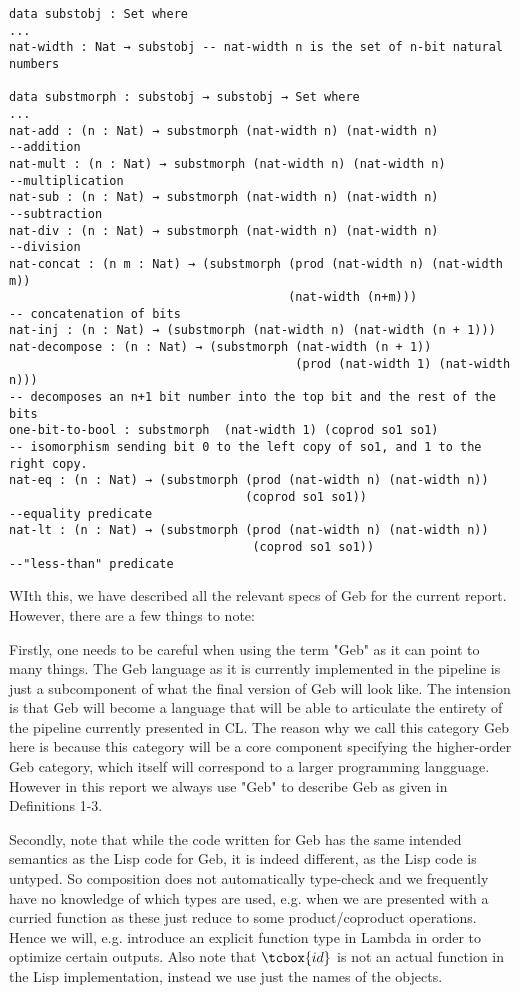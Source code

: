 \begin{verbatim}
data substobj : Set where
...
nat-width : Nat → substobj -- nat-width n is the set of n-bit natural numbers

data substmorph : substobj → substobj → Set where
...
nat-add : (n : Nat) → substmorph (nat-width n) (nat-width n) 
--addition
nat-mult : (n : Nat) → substmorph (nat-width n) (nat-width n)
--multiplication
nat-sub : (n : Nat) → substmorph (nat-width n) (nat-width n)
--subtraction
nat-div : (n : Nat) → substmorph (nat-width n) (nat-width n) 
--division 
nat-concat : (n m : Nat) → (substmorph (prod (nat-width n) (nat-width m))
                                       (nat-width (n+m))) 
-- concatenation of bits
nat-inj : (n : Nat) → (substmorph (nat-width n) (nat-width (n + 1)))
nat-decompose : (n : Nat) → (substmorph (nat-width (n + 1)) 
                                        (prod (nat-width 1) (nat-width n)))
-- decomposes an n+1 bit number into the top bit and the rest of the bits
one-bit-to-bool : substmorph  (nat-width 1) (coprod so1 so1)
-- isomorphism sending bit 0 to the left copy of so1, and 1 to the right copy.
nat-eq : (n : Nat) → (substmorph (prod (nat-width n) (nat-width n)) 
                                 (coprod so1 so1))
--equality predicate
nat-lt : (n : Nat) → (substmorph (prod (nat-width n) (nat-width n))
                                  (coprod so1 so1))
--"less-than" predicate
\end{verbatim}

WIth this, we have described all the relevant specs of Geb for the current report. However, there are a few things to note:

Firstly, one needs to be careful when using the term "Geb" as it can point to many things. The Geb language as it is currently implemented in the pipeline is just a subcomponent of what the final version of Geb will look like. The intension is that Geb will become a language that will be able to articulate the entirety of the pipeline currently presented in CL. The reason why we call this category Geb here is because this category will be a core component specifying the higher-order Geb category, which itself will correspond to a larger programming langguage. However in this report we always use "Geb" to describe Geb as given in Definitions 1-3.

Secondly, note that while the code written for Geb has the same intended semantics as the Lisp code for Geb, it is indeed different, as the Lisp code is untyped. So composition does not automatically type-check and we frequently have no knowledge of which types are used, e.g. when we are presented with a curried function as these just reduce to some product/coproduct operations. Hence we will, e.g. introduce an explicit function type in Lambda in order to optimize certain outputs. Also note that $\tcbox{id}$ is not an actual function in the Lisp implementation, instead we use just the names of the objects.
 
